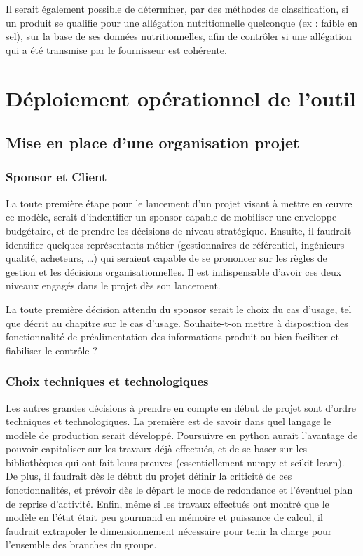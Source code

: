     Il serait également possible de déterminer, par des méthodes de classification, si un produit se qualifie pour une allégation nutritionnelle quelconque (ex : faible en sel), sur la base de ses données nutritionnelles, afin de contrôler si une allégation qui a été transmise par le fournisseur est cohérente.

    \chapter{Déploiement opérationnel de l'outil}    

        \section{Mise en place d'une organisation projet}
            
            \subsection{Sponsor et Client}

            La toute première étape pour le lancement d'un projet visant à mettre en \oe uvre ce modèle, serait d'indentifier un sponsor capable de mobiliser une enveloppe budgétaire, et de prendre les décisions de niveau stratégique.
            Ensuite, il faudrait identifier quelques représentants métier (gestionnaires de référentiel, ingénieurs qualité, acheteurs, \dots) qui seraient capable de se prononcer sur les règles de gestion et les décisions organisationnelles.
            Il est indispensable d'avoir ces deux niveaux engagés dans le projet dès son lancement.

            La toute première décision attendu du sponsor serait le choix du cas d'usage, tel que décrit au chapitre  sur le cas d'usage.
            Souhaite-t-on mettre à disposition des fonctionnalité de préalimentation des informations produit ou bien faciliter et fiabiliser le contrôle ?

            \subsection{Choix techniques et technologiques}

            Les autres grandes décisions à prendre en compte en début de projet sont d'ordre techniques et technologiques.
            La première est de savoir dans quel langage le modèle de production serait développé.
            Poursuivre en python aurait l'avantage de pouvoir capitaliser sur les travaux déjà effectués, et de se baser sur les bibliothèques qui ont fait leurs preuves (essentiellement numpy et scikit-learn).
            De plus, il faudrait dès le début du projet définir la criticité de ces fonctionnalités, et prévoir dès le départ le mode de redondance et l'éventuel plan de reprise d'activité.
            Enfin, même si les travaux effectués ont montré que le modèle en l'état était peu gourmand en mémoire et puissance de calcul, il faudrait extrapoler le dimensionnement nécessaire pour tenir la charge pour l'ensemble des branches du groupe.

